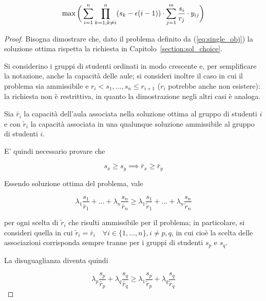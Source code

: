 \begin{equation}
    \max \bigg( \sum_{i=1}^{n} \prod_{k=1,\\ k\neq i}^{n} (s_k - \epsilon (i- 1)) \cdot \sum_{j = 1}^{m}\frac{s_i}{r_j} \cdot y_{ij}\bigg)
    \label{eq:single_obj}
\end{equation}

\begin{proof}
    Bisogna dimostrare che, dato il problema definito da (\ref{eq:single_obj})
    la soluzione ottima rispetta la richiesta in Capitolo~\ref{section:sol_choice}.
    
    Si considerino i gruppi di studenti ordinati in modo crescente e, per 
    semplificare la notazione, anche la capacità delle aule;
    si consideri inoltre il caso in cui il problema sia ammissibile e $r_i < s_1, \dots, s_n \leq r_{i+1}$ ($r_i$ potrebbe 
    anche non esistere): la richiesta non è restrittiva, in quanto la dimostrazione negli 
    altri casi è analoga.

    Sia $\bar{r}_i$ la capacità dell'aula associata nella soluzione 
    ottima al gruppo di studenti $i$ e con $\tilde{r}_i$ la capacità associata in una 
    qualunque soluzione ammissibile al gruppo di studenti $i$.

    E' quindi necessario provare che 
    
    \begin{equation}
        s_x \geq s_y \implies \bar{r}_x \geq \bar{r}_y    
        \label{eq:}
    \end{equation}
    
    Essendo soluzione ottima del problema, vale
    
    \begin{equation*}
        \lambda_1 \frac{s_1}{\bar{r}_1} + \dots + \lambda_{n} \frac{s_{n}}{\bar{r}_{n}} \geq
        \lambda_1 \frac{s_1}{\tilde{r}_1} + \dots + \lambda_{n} \frac{s_{n}}{\tilde{r}_{n}}
        \label{eq:}
    \end{equation*}
    
    \noindent
    per ogni scelta di $\tilde{r}_i$ che risulti ammissibile per il problema; in particolare, 
    si consideri quella in cui $\tilde{r}_i = \bar{r}_i \quad \forall i \in \{1, \dots, n\}, i \neq p, q$,
    in cui cioè la scelta delle associazioni corrisponda sempre tranne per i gruppi di studenti 
    $s_p$ e $s_q$.
    
    La disuguaglianza diventa quindi
    
    \begin{equation*}
        \lambda_p \frac{s_p}{\bar{r}_p} + \lambda_{q} \frac{s_{q}}{\bar{r}_{q}} \geq
        \lambda_1 \frac{s_p}{\tilde{r}_p} + \lambda_{q} \frac{s_{q}}{\tilde{r}_{q}}
        \label{eq:}
    \end{equation*}
    

\end{proof}
